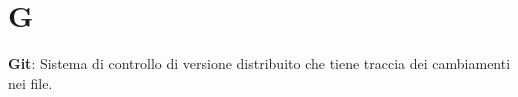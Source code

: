 \section{G}
\textbf{Git}: Sistema di controllo di versione distribuito che tiene traccia dei cambiamenti nei file.